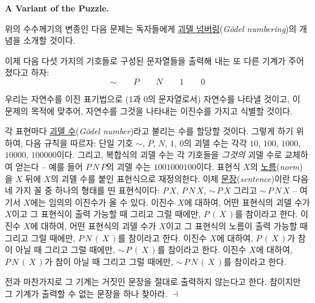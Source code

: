 \documentclass[12pt]{paper}
\newenvironment{context}[1][]
{ \noindent \textbf{{#1}.}
}
{ \hfill $ \dashv $
}
\begin{document}
\begin{context}[A Variant of the Puzzle]
위의 수수께기의 변종인 다음 문제는 독자들에게 \underline{괴델 넘버링}(\textit{G\"odel numbering})의 개념을 소개할 것이다.

이제 다음 다섯 가지의 기호들로 구성된 문자열들을 출력해 내는 또 다른 기계가 주어졌다고 하자:
$$ \sim \qquad P \qquad N \qquad 1 \qquad 0 $$

우리는 자연수를 이진 표기법으로 (1과 0의 문자열로서) 자연수를 나타낼 것이고,
이 문제의 목적에 맞추어, 자연수를 그것을 나타내는 이진수를 가지고 식별할 것이다.

각 표현마다 \underline{괴델 수}(\textit{G\"odel number})라고 불리는 수를 할당할 것이다.
그렇게 하기 위하여, 다음 규칙을 따르자:
단일 기호 $\sim$, $P$, $N$, $1$, $0$의 괴델 수는 각각 $10$, $100$, $1000$, $10000$, $100000$이다.
그리고, 복합식의 괴델 수는 각 기호들을 \textit{그것의} 괴델 수로 교체하여 얻는다 --
예를 들어 $P \, N \, P$의 괴델 수는 $1001000100$이다.
표현식 $X$의 \underline{노름}(\textit{norm})을 $X$ 뒤에 $X$의 괴델 수를 붙인 표현식으로 재정의한다.
이제 \underline{문장}(\textit{sentence})이란 다음 네 가지 꼴 중 하나의 형태를 띤 표현식이다:
$P \, X$, $P \, N \, X$, $\sim \, P \, X$ 그리고 $\sim \, P \, N \, X$ --
여기서 $X$에는 임의의 이진수가 올 수 있다.
이진수 $X$에 대하여, 어떤 표현식의 괴델 수가 $X$이고 그 표현식이 출력 가능할 때 그리고 그럴 때에만,
$P \, \left( \, X \, \right)$를 참이라고 한다.
이진수 $X$에 대하여, 어떤 표현식의 괴델 수가 $X$이고 그 표현식의 노름이 출력 가능할 때 그리고 그럴 때에만,
$P \, N \, \left( \, X \, \right)$를 참이라고 한다.
이진수 $X$에 대하여, $P \, \left( \, X \, \right)$가 참이 아닐 때 그리고 그럴 때에만,
$\sim \, P \, \left( \, X \, \right)$를 참이라고 한다.
이진수 $X$에 대하여, $P \, N \, \left( \, X \, \right)$가 참이 아닐 때 그리고 그럴 때에만,
$\sim \, P \, N \, \left( \, X \, \right)$를 참이라고 한다.

전과 마찬가지로 그 기계는 거짓인 문장을 절대로 출력하지 않는다고 한다.
참이지만 그 기계가 출력할 수 없는 문장을 하나 찾아라.
\end{context}
\end{document}
